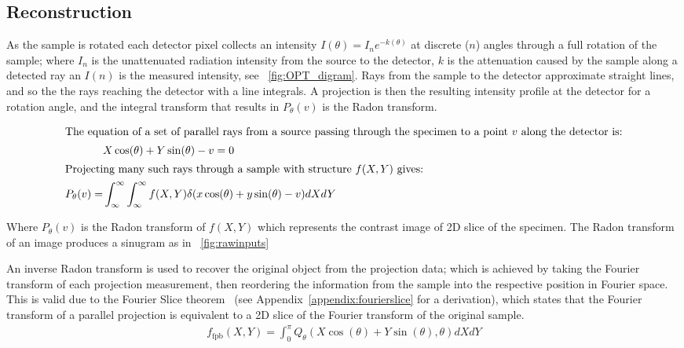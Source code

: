 \subsection{Reconstruction}

As the sample is rotated each detector pixel collects an intensity \(I(\theta) = I_{n}e^{-k(\theta)}\) at discrete (\(n\)) angles through a full rotation of the sample; where \(I_{n}\) is the unattenuated radiation intensity from the source to the detector, \(k\) is the attenuation caused by the sample along a detected ray an \(I(n)\) is the measured intensity, see \figurename~\ref{fig:OPT_digram}.
Rays from the sample to the detector approximate straight lines, and so the the rays reaching the detector with a line integrals.
A projection is then the resulting intensity profile at the detector for a rotation angle, and the integral transform that results in \(P_\theta(v)\)
is the \gls{Radon transform}.

\begin{align}
    \intertext{The equation of a set of parallel rays from a source passing through the specimen to a point \(v\) along the detector is:}
    &X\cos(\theta) + Y\sin(\theta) - v = 0 \\
    \intertext{Projecting many such rays through a sample with structure \(f(X,Y)\) gives:}
    P_\theta(v) = &\int_{\infty}^{\infty} \int_{\infty}^{\infty} f(X,Y)\delta (x\cos(\theta)+y \sin(\theta)-v)dX dY
\end{align}


Where \(P_\theta(v)\) is the \gls{Radon transform} of \(f(X,Y)\) which represents the contrast image of \gls{2D} slice of the specimen.
The \gls{Radon transform} of an image produces a \gls{sinugram} as in \figurename~\ref{fig:rawinputs}



An inverse \gls{Radon transform} is used to recover the original object from the projection data; which is achieved by taking the \gls{Fourier transform} of each projection measurement, then reordering the information from the sample into the respective position in Fourier space.
This is valid due to the Fourier Slice theorem~\cite{bracewellStripIntegrationRadio1956} (see Appendix~\ref{appendix:fourierslice} for a derivation), which states that the \gls{Fourier transform} of a parallel projection is equivalent to a 2D slice of the Fourier transform of the original sample.
\begin{align}
f_{\text{fpb}}(X,Y) = \int_{0}^{\pi} Q_\theta (X\cos(\theta)+Y\sin(\theta),\theta)dXdY
\end{align}

